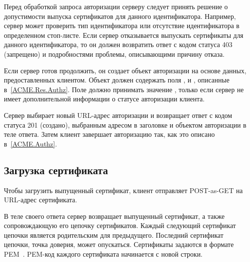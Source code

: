 Перед обработкой запроса авторизации серверу следует принять решение о 
допустимости выпуска сертификатов для данного идентификатора. Например, сервер 
может проверить тип идентификатора или отсутствие идентификатора в определенном 
стоп-листе.
%
Если сервер отказывается выпускать сертификаты для данного идентификатора, то 
он должен возвратить ответ с кодом статуса 403 (запрещено) и подробностями
проблемы, описывающими причину отказа. 

Если сервер готов продолжить, он создает объект авторизации на основе данных, 
предоставленных клиентом. Объект должен содержать поля , 
 и , описанные в~\ref{ACME.Res.Authz}.
%
Поле  должно принимать значение , только если 
сервер не имеет дополнительной информации о статусе авторизации клиента.

Сервер выбирает новый URL-адрес авторизации и возвращает ответ с кодом 
статуса 201 (создано), выбранным адресом в заголовке  
и объектом авторизации в теле ответа. 
%
Затем клиент завершает авторизацию так, как это описано в~\ref{ACME.Authz}.


\subsection{Загрузка сертификата}\label{ACME.Order.Cert}
 
Чтобы загрузить выпущенный сертификат, клиент отправляет 
 POST-as-GET на URL-адрес сертификата.

В теле своего ответа сервер возвращает выпущенный сертификат,
а также сопровождающую его цепочку сертификатов. Каждый 
следующий сертификат цепочки является родительским для предыдущего.
Последний сертификат цепочки, точка доверия, может опускаться.     
%
Сертификаты задаются в формате PEM~\cite{RFC7468}.
%
PEM-код каждого сертификата начинается с новой строки.


